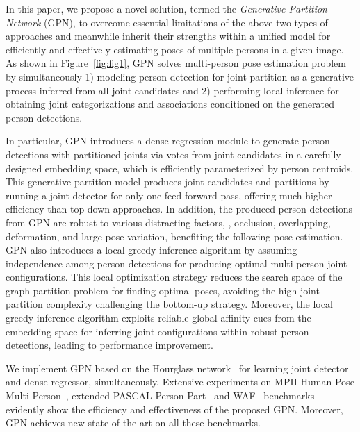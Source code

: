 \documentclass[10pt,twocolumn,letterpaper]{article}
\begin{document}
In this paper, we propose a novel solution, termed the \emph{Generative Partition Network} (GPN),  to overcome essential limitations of the
above two types of approaches and meanwhile inherit their strengths within a unified model for efficiently and effectively estimating poses of multiple persons in a given image.
As shown in Figure~\ref{fig:fig1}, GPN solves multi-person pose estimation problem by simultaneously
1) modeling person detection for joint partition as a generative process inferred from all joint candidates and
2) performing local inference for obtaining joint categorizations and associations conditioned on the generated person detections.

In particular, GPN introduces a dense regression module to generate person detections with partitioned joints via votes from joint candidates in a carefully designed embedding space, which is efficiently parameterized by person centroids. This generative partition model produces joint candidates and partitions by running a joint detector for only one feed-forward pass, offering much higher efficiency than top-down approaches. In addition, the produced person detections from GPN are robust to various distracting factors, \eg, occlusion, overlapping, deformation, and large pose variation, benefiting the following pose estimation. GPN also introduces a local greedy inference algorithm by assuming independence among person detections for producing optimal multi-person joint configurations. This local optimization strategy reduces the search space of the graph partition problem for finding optimal poses, avoiding the high joint partition complexity challenging the bottom-up strategy. Moreover, the local greedy inference algorithm exploits reliable global affinity cues from the embedding space for inferring joint configurations within robust person detections, leading to performance improvement.


We implement GPN based on the Hourglass network~\cite{hpe:hourglass_arxiv15} for learning joint detector and dense regressor, simultaneously. Extensive experiments on MPII Human Pose Multi-Person~\cite{andriluka14cvpr}, extended PASCAL-Person-Part~\cite{xia2017joint} and WAF~\cite{eichner2010we} benchmarks evidently show the efficiency and effectiveness of the proposed GPN. Moreover, GPN achieves new state-of-the-art on all these benchmarks.
\end{document}
